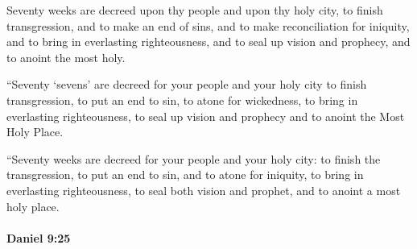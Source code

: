 			\begin{versebox}
					\item[BHS] 
					\item[LXX] 
					\item[ASV] Seventy weeks are decreed upon thy people and upon thy holy city, to finish transgression, and to make an end of sins, and to make reconciliation for iniquity, and to bring in everlasting righteousness, and to seal up vision and prophecy, and to anoint the most holy.
					\item[NIV] “Seventy ‘sevens’ are decreed for your people and your holy city to finish transgression, to put an end to sin, to atone for wickedness, to bring in everlasting righteousness, to seal up vision and prophecy and to anoint the Most Holy Place.
					\item[NRSV] “Seventy weeks are decreed for your people and your holy city: to finish the transgression, to put an end to sin, and to atone for iniquity, to bring in everlasting righteousness, to seal both vision and prophet, and to anoint a most holy place.
			\end{versebox}

		\paragraph{Daniel 9:25} %
			\label{DANIEL-9-25}

